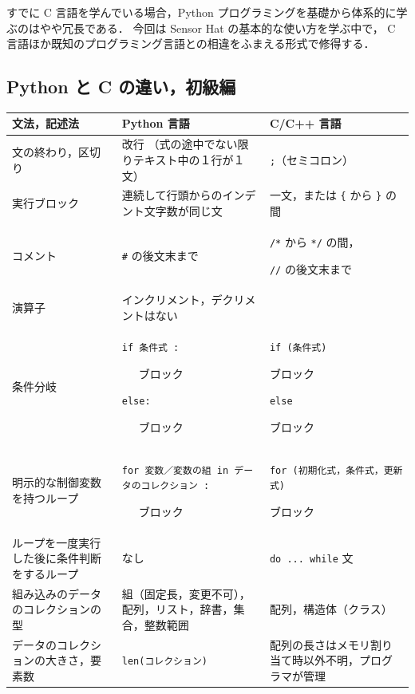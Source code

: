 \documentclass[11pt,a4,epsf]{report}
\begin{document}
すでに C 言語を学んでいる場合，Python プログラミングを基礎から体系的に学ぶのはやや冗長である．
今回は Sensor Hat の基本的な使い方を学ぶ中で， C 言語ほか既知のプログラミング言語との相違をふまえる形式で修得する．

\subsection{Python と C の違い，初級編}
  \begin{tabular}{|p{1.5in}|p{2in}|p{2in}|}
\hline
文法，記述法 & Python 言語 & C/C++ 言語 \\
\hline
\hline
文の終わり，区切り & 改行 （式の途中でない限りテキスト中の１行が１文） & \verb+;+（セミコロン） \\
\hline
実行ブロック & 連続して行頭からのインデント文字数が同じ文 & 一文，または \verb+{+ から \verb+}+ の間\\
\hline
コメント & \verb+#+ の後文末まで & \verb+/*+ から \verb+*/+ の間，\par \verb+//+ の後文末まで \\
\hline
演算子 & インクリメント，デクリメントはない &  \\
\hline
条件分岐 & \verb+if 条件式 :+\par ~~~ブロック \par\verb+else:+ \par ~~~ブロック & \verb+if (条件式) +\par ブロック\par\verb+else+\par ブロック \\
\hline
明示的な制御変数を持つループ & \verb+for 変数／変数の組 in データのコレクション :+ \par ~~~ブロック& \verb+for (初期化式，条件式，更新式)+ \par ブロック \\
\hline
ループを一度実行した後に条件判断をするループ & なし & \verb+do ... while+ 文\\
\hline
組み込みのデータのコレクションの型 & 組（固定長，変更不可），配列，リスト，辞書，集合，整数範囲 & 配列，構造体（クラス）\\
\hline
データのコレクションの大きさ，要素数 & \verb+len(コレクション)+ & 配列の長さはメモリ割り当て時以外不明，プログラマが管理\\
\hline
  \end{tabular}
\end{document}
